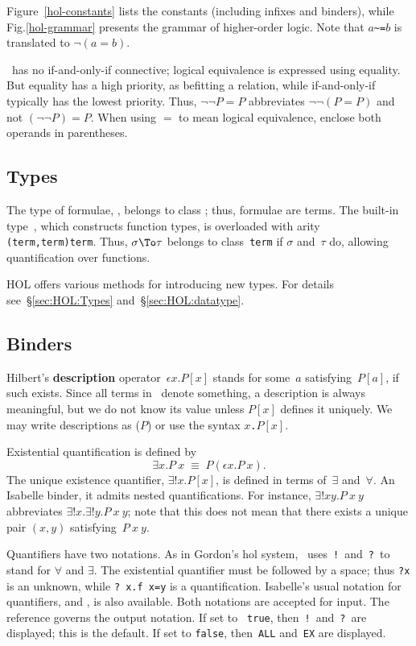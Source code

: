 Figure~\ref{hol-constants} lists the constants (including infixes and
binders), while Fig.\ts\ref{hol-grammar} presents the grammar of
higher-order logic.  Note that $a$\verb|~=|$b$ is translated to
$\neg(a=b)$.

\begin{warn}
  \HOL\ has no if-and-only-if connective; logical equivalence is expressed
  using equality.  But equality has a high priority, as befitting a
  relation, while if-and-only-if typically has the lowest priority.  Thus,
  $\neg\neg P=P$ abbreviates $\neg\neg (P=P)$ and not $(\neg\neg P)=P$.
  When using $=$ to mean logical equivalence, enclose both operands in
  parentheses.
\end{warn}

\subsection{Types}\label{hol-types}
The type of formulae, , belongs to class ; thus,
formulae are terms.  The built-in type~, which constructs function
types, is overloaded with arity {\tt(term,term)term}.  Thus, $\sigma\To\tau$
belongs to class~{\tt term} if $\sigma$ and~$\tau$ do, allowing quantification
over functions.

HOL offers various methods for introducing new types. For details
see~\S\ref{sec:HOL:Types} and~\S\ref{sec:HOL:datatype}.


\subsection{Binders}
Hilbert's {\bf description} operator~$\epsilon x.P[x]$ stands for some~$a$
satisfying~$P[a]$, if such exists.  Since all terms in \HOL\ denote
something, a description is always meaningful, but we do not know its value
unless $P[x]$ defines it uniquely.  We may write descriptions as
($P$) or use the syntax
\hbox{\tt \at $x$.$P[x]$}.

Existential quantification is defined by
\[ \exists x.P~x \;\equiv\; P(\epsilon x.P~x). \]
The unique existence quantifier, $\exists!x.P[x]$, is defined in terms
of~$\exists$ and~$\forall$.  An Isabelle binder, it admits nested
quantifications.  For instance, $\exists!x y.P~x~y$ abbreviates
$\exists!x. \exists!y.P~x~y$; note that this does not mean that there
exists a unique pair $(x,y)$ satisfying~$P~x~y$.

Quantifiers have two notations.  As in Gordon's {\sc hol} system, \HOL\
uses~{\tt!}\ and~{\tt?}\ to stand for $\forall$ and $\exists$.  The
existential quantifier must be followed by a space; thus {\tt?x} is an
unknown, while \verb'? x.f x=y' is a quantification.  Isabelle's usual
notation for quantifiers, \sdx{ALL} and \sdx{EX}, is also
available.  Both notations are accepted for input.  The {\ML} reference
\ttindexbold{HOL_quantifiers} governs the output notation.  If set to {\tt
true}, then~{\tt!}\ and~{\tt?}\ are displayed; this is the default.  If set
to {\tt false}, then~{\tt ALL} and~{\tt EX} are displayed.

